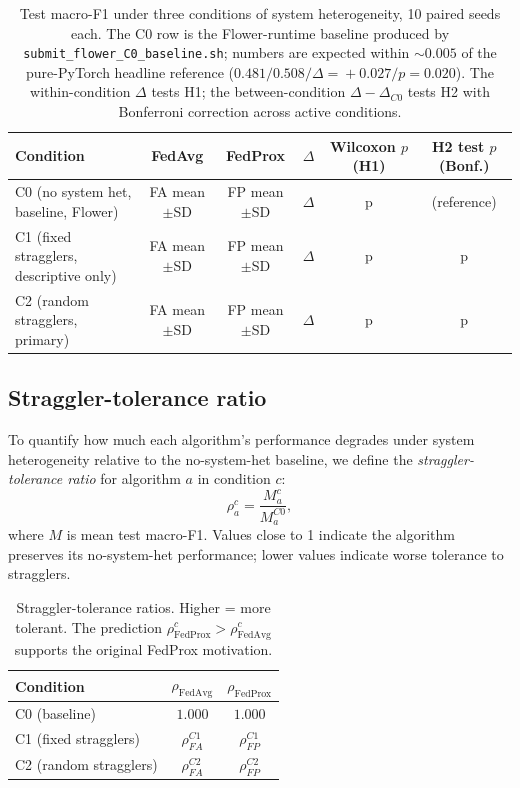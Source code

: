 \documentclass[11pt,a4paper]{article}
\newif\ifshowtodosh
\newcommand{\TODOhpcSH}[1]{%
  \ifshowtodosh\textcolor{red}{\textbf{[SH-HPC: #1]}}\else#1\fi}
\begin{document}
\begin{table}[h]
\centering
\caption{Test macro-F1 under three conditions of system heterogeneity,
10 paired seeds each. The C0 row is the Flower-runtime baseline
produced by \texttt{submit\_flower\_C0\_baseline.sh}; numbers are
expected within $\sim 0.005$ of the pure-PyTorch headline reference
($0.481 / 0.508 / \Delta\!=\!+0.027 / p\!=\!0.020$). The within-condition
$\Delta$ tests H1; the between-condition $\Delta - \Delta_{C0}$ tests
H2 with Bonferroni correction across active conditions.}
\label{tab:sh-headline}
\small
\begin{tabular}{lccccc}
\toprule
Condition & FedAvg & FedProx & $\Delta$ & Wilcoxon $p$ (H1) & H2 test $p$ (Bonf.) \\
\midrule
C0 (no system het, baseline, Flower) & \TODOhpcSH{FA mean$\pm$SD} & \TODOhpcSH{FP mean$\pm$SD} & \TODOhpcSH{$\Delta$} & \TODOhpcSH{p} & (reference) \\
C1 (fixed stragglers, descriptive only)  & \TODOhpcSH{FA mean$\pm$SD} & \TODOhpcSH{FP mean$\pm$SD} & \TODOhpcSH{$\Delta$} & \TODOhpcSH{p} & \TODOhpcSH{p} \\
C2 (random stragglers, primary)          & \TODOhpcSH{FA mean$\pm$SD} & \TODOhpcSH{FP mean$\pm$SD} & \TODOhpcSH{$\Delta$} & \TODOhpcSH{p} & \TODOhpcSH{p} \\
\bottomrule
\end{tabular}
\end{table}

\subsection{Straggler-tolerance ratio}

To quantify how much each algorithm's performance degrades under system
heterogeneity relative to the no-system-het baseline, we define the
\emph{straggler-tolerance ratio} for algorithm $a$ in condition $c$:
\[
\rho_a^c = \frac{M_a^c}{M_a^{C0}},
\]
where $M$ is mean test macro-F1. Values close to 1 indicate the algorithm
preserves its no-system-het performance; lower values indicate worse
tolerance to stragglers.

\begin{table}[h]
\centering
\caption{Straggler-tolerance ratios. Higher = more tolerant. The prediction
$\rho_\text{FedProx}^c > \rho_\text{FedAvg}^c$ supports the original
FedProx motivation.}
\label{tab:sh-tolerance}
\small
\begin{tabular}{lcc}
\toprule
Condition & $\rho_\text{FedAvg}$ & $\rho_\text{FedProx}$ \\
\midrule
C0 (baseline) & $1.000$ & $1.000$ \\
C1 (fixed stragglers)  & \TODOhpcSH{$\rho_{FA}^{C1}$} & \TODOhpcSH{$\rho_{FP}^{C1}$} \\
C2 (random stragglers) & \TODOhpcSH{$\rho_{FA}^{C2}$} & \TODOhpcSH{$\rho_{FP}^{C2}$} \\
\bottomrule
\end{tabular}
\end{table}
\end{document}

